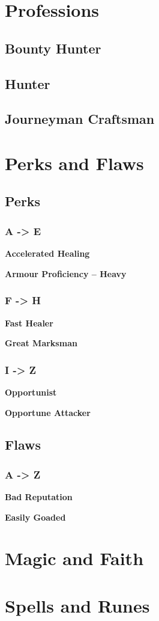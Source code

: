 \documentclass[12pt]{article}
\newcommand{\subsubsubsection}[1]{%
  \vspace{1em} %
  \noindent\textbf{\small #1}\par
  \vspace{0.5em} %
}
\begin{document}
\section{Professions}
\subsection{Bounty Hunter}
\subsection{Hunter}
\subsection{Journeyman Craftsman}
\section{Perks and Flaws}
\subsection{Perks}
\subsubsection{A -> E}
\subsubsubsection{Accelerated Healing}
\subsubsubsection{Armour Proficiency – Heavy}
\subsubsection{F -> H}
\subsubsubsection{Fast Healer}
\subsubsubsection{Great Marksman}
\subsubsection{I -> Z}
\subsubsubsection{Opportunist}
\subsubsubsection{Opportune Attacker}
\subsection{Flaws}
\subsubsection{A -> Z}
\subsubsubsection{Bad Reputation}
\subsubsubsection{Easily Goaded}

\section{Magic and Faith}


\section{Spells and Runes}
\end{document}
